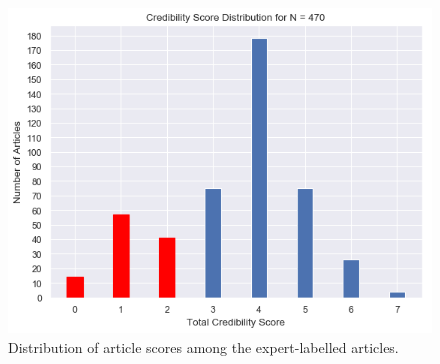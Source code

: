 \documentclass[a4paper,twoside,phd]{BYUPhys}
\begin{document}
\begin{figure}[!htb]
	\centering
	\includegraphics[totalheight=7cm]{images/article-score-distribution.png}
	\caption{Distribution of article scores among the expert-labelled articles.}
	\label{fig:ArticleDistribution}
\end{figure}
\end{document}
